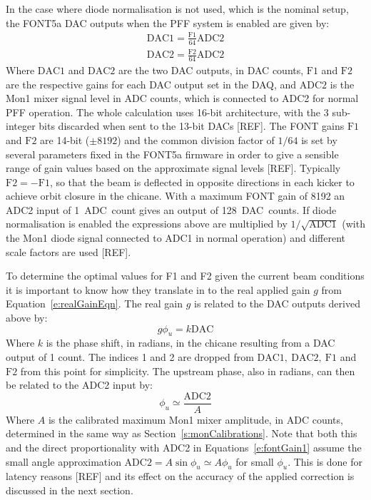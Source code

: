 In the case where diode normalisation is not used, which is the nominal setup, the FONT5a DAC outputs when the PFF system is enabled are given by:
\begin{eqnarray}
\mathrm{DAC1} = \frac{\mathrm{F1}}{64}\mathrm{ADC2} \nonumber \\ 
\mathrm{DAC2} = \frac{\mathrm{F2}}{64}\mathrm{ADC2} \label{e:fontGain1}
\end{eqnarray}
Where \(\mathrm{DAC1}\) and \(\mathrm{DAC2}\) are the two DAC outputs, in DAC counts, \(\mathrm{F1}\) and \(\mathrm{F2}\) are the respective gains for each DAC output set in the DAQ, and \(\mathrm{ADC2}\) is the Mon1 mixer signal level in ADC counts, which is connected to ADC2 for normal PFF operation. The whole calculation uses 16-bit architecture, with the 3 sub-integer bits discarded when sent to the 13-bit DACs [REF]. The FONT gains \(\mathrm{F1}\) and \(\mathrm{F2}\) are 14-bit (\(\pm8192\)) and the common division factor of \(1/64\) is set by several parameters fixed in the FONT5a firmware in order to give a sensible range of gain values based on the approximate signal levels [REF]. Typically \(\mathrm{F2} = -\mathrm{F1}\), so that the beam is deflected in opposite directions in each kicker to achieve orbit closure in the chicane. With a maximum FONT gain of 8192 an ADC2 input of 1~ADC~count gives an output of 128~DAC~counts. If diode normalisation is enabled the expressions above are multiplied by \(1/\sqrt{\mathrm{ADC1}}\) (with the Mon1 diode signal connected to ADC1 in normal operation) and different scale factors are used [REF].

To determine the optimal values for F1 and F2 given the current beam conditions it is important to know how they translate in to the real applied gain \(g\) from Equation~\ref{e:realGainEqn}. The real gain \(g\) is related to the DAC outputs derived above by:
\begin{equation} \label{e:fontGain2}
g\phi_u = k\mathrm{DAC}
\end{equation}
Where \(k\) is the phase shift, in radians, in the chicane resulting from a DAC output of 1 count. The indices 1 and 2 are dropped from \(\mathrm{DAC1,~DAC2,~F1}\) and \(\mathrm{F2}\) from this point for simplicity. The upstream phase, also in radians, can then be related to the ADC2 input by:
\begin{equation} \label{e:fontGain3}
\phi_u \simeq \frac{\mathrm{ADC2}}{A}
\end{equation}
Where \(A\) is the calibrated maximum Mon1 mixer amplitude, in ADC counts, determined in the same way as Section~\ref{s:monCalibrations}. Note that both this and the direct proportionality with ADC2 in Equations~\ref{e:fontGain1} assume the small angle approximation \(\mathrm{ADC2} = A\sin\phi_u \simeq A\phi_u\) for small \(\phi_u\). This is done for latency reasons [REF] and its effect on the accuracy of the applied correction is discussed in the next section.


